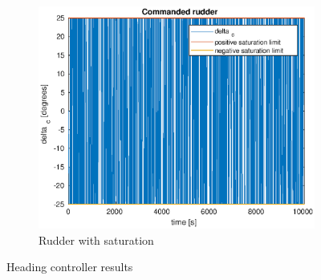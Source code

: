 \begin{figure}[ht]
\begin{subfigure}[b]{0.3\textwidth}
		\includegraphics[width=\textwidth]{rudder1_4}
		\caption{Rudder with saturation}
		\label{fig:rudder1_4}
	\end{subfigure}
	\caption{Heading controller results}\label{fig:2}
\end{figure}




